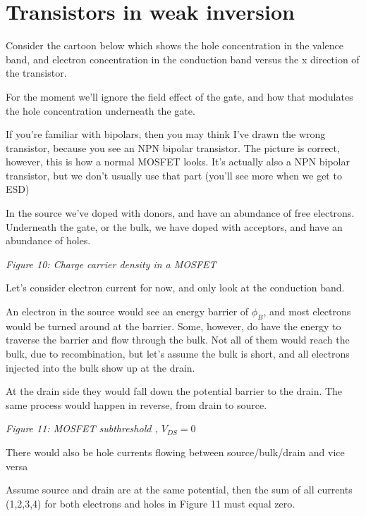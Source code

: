\section{Transistors in weak
inversion}\label{transistors-in-weak-inversion}

Consider the cartoon below which shows the hole concentration in the
valence band, and electron concentration in the conduction band versus
the x direction of the transistor.

For the moment we'll ignore the field effect of the gate, and how that
modulates the hole concentration underneath the gate.

If you're familiar with bipolars, then you may think I've drawn the
wrong transistor, because you see an NPN bipolar transistor. The picture
is correct, however, this is how a normal MOSFET looks. It's actually
also a NPN bipolar transistor, but we don't usually use that part
(you'll see more when we get to ESD)

In the source we've doped with donors, and have an abundance of free
electrons. Underneath the gate, or the bulk, we have doped with
acceptors, and have an abundance of holes.


{
\centering
{}
}

\emph{Figure 10: Charge carrier density in a MOSFET}

Let's consider electron current for now, and only look at the conduction
band.

An electron in the source would see an energy barrier of \(\phi_B\), and
most electrons would be turned around at the barrier. Some, however, do
have the energy to traverse the barrier and flow through the bulk. Not
all of them would reach the bulk, due to recombination, but let's assume
the bulk is short, and all electrons injected into the bulk show up at
the drain.

At the drain side they would fall down the potential barrier to the
drain. The same process would happen in reverse, from drain to source.


{
\centering
{}
}

\emph{Figure 11: MOSFET subthreshold , \(V_{DS} = 0\)}

There would also be hole currents flowing between source/bulk/drain and
vice versa

Assume source and drain are at the same potential, then the sum of all
currents (1,2,3,4) for both electrons and holes in Figure 11 must equal
zero.

